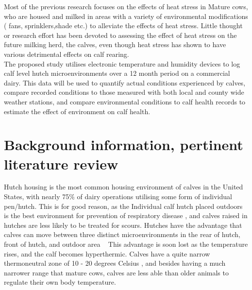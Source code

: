 \documentclass[12pt]{article}
\begin{document}
	Most of the previous research focuses on the effects of heat stress in Mature cows, who are housed and milked in areas with a variety of environmental modifications ( fans, sprinklers,shade etc.)  to alleviate the effects of heat stress.\cite{Armstrong1994}
	Little thought or research effort has been devoted to assessing the effect of heat stress on the future milking herd, the calves, even though heat stress has shown to have various detrimental effects on calf rearing. \cite{Stott1976,lacetera1994}\\


	The proposed study utilises electronic temperature and humidity devices to log calf level hutch microenvironments over a 12 month period on a commercial dairy. This data will be used to quantify actual conditions experienced by calves, compare recorded conditions to those measured with both local and county wide weather stations, and compare environmental conditions to calf health records to estimate the effect of environment on calf health. 

	\newpage
	\section{Background information, pertinent literature review}
	Hutch housing is the most common housing environment of calves in the United States, with nearly 75\% of dairy operations utilising some form of individual pen/hutch.\cite{NAHMS2007}
	This is for good reason, as the Individual calf hutch placed outdoors is the best environment for prevention of respiratory disease \cite{callan2002biosecurity}, and calves raised in hutches are less likely to be treated for scours. \cite{Waltner-Toews1986}
	Hutches have the advantage that calves can move between three distinct microenvironments in the rear of hutch, front of hutch, and outdoor area ~\cite{brunsvold1985} 
	This advantage is soon lost as the temperature rises, and the calf becomes hyperthermic. Calves have a quite narrow thermoneutral zone of 10 - 20 degrees Celsius \cite{Gebremedhin1981}, and besides having a much narrower range that mature cows, calves are less able than older animals to regulate their own body temperature.\cite{Christopherson1976}\\
\end{document}
